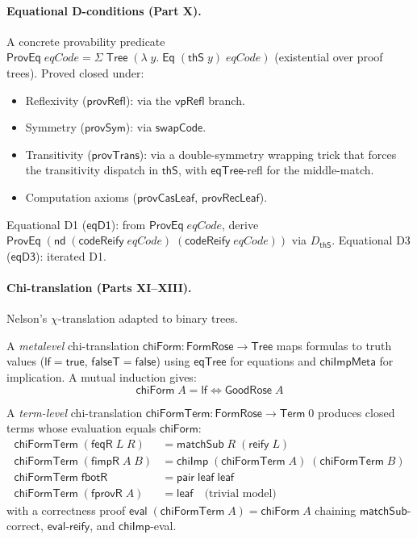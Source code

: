 \documentclass[11pt]{article}
\newcommand{\lf}{\mathsf{lf}}
\newcommand{\nd}{\mathsf{nd}}
\newcommand{\eval}{\mathsf{eval}}
\newcommand{\reify}{\mathsf{reify}}
\newcommand{\codeReify}{\mathsf{codeReify}}
\newcommand{\thS}{\mathsf{thS}}
\newcommand{\eqTree}{\mathsf{eqTree}}
\newcommand{\swapCode}{\mathsf{swapCode}}
\newcommand{\Tree}{\mathsf{Tree}}
\newcommand{\Term}{\mathsf{Term}}
\newcommand{\Eq}{\mathsf{Eq}}
\newcommand{\dThS}{D_{\thS}}
\begin{document}
\paragraph{Equational D-conditions (Part X).}
A concrete provability predicate $\mathsf{ProvEq}\;\mathit{eqCode} =
\Sigma\;\Tree\;(\lambda\;y.\;\Eq\;(\thS\;y)\;\mathit{eqCode})$ (existential
over proof trees). Proved closed under:
\begin{itemize}
  \item Reflexivity ($\mathsf{provRefl}$): via the $\mathsf{vpRefl}$ branch.
  \item Symmetry ($\mathsf{provSym}$): via $\swapCode$.
  \item Transitivity ($\mathsf{provTrans}$): via a double-symmetry wrapping trick
    that forces the transitivity dispatch in $\thS$, with $\eqTree$-refl for the
    middle-match.
  \item Computation axioms ($\mathsf{provCasLeaf}$, $\mathsf{provRecLeaf}$).
\end{itemize}
Equational D1 ($\mathsf{eqD1}$): from $\mathsf{ProvEq}\;\mathit{eqCode}$,
derive $\mathsf{ProvEq}\;(\nd\;(\codeReify\;\mathit{eqCode})\;(\codeReify\;\mathit{eqCode}))$
via $\dThS$. Equational D3 ($\mathsf{eqD3}$): iterated D1.

\paragraph{Chi-translation (Parts XI--XIII).}
Nelson's $\chi$-translation adapted to binary trees.

A \emph{metalevel} chi-translation $\mathsf{chiForm} : \mathsf{FormRose} \to \Tree$
maps formulas to truth values ($\lf = \mathsf{true}$, $\mathsf{falseT} = \mathsf{false}$)
using $\eqTree$ for equations and $\mathsf{chiImpMeta}$ for implication.
A mutual induction gives:
\[
  \mathsf{chiForm}\;A = \lf \iff \mathsf{GoodRose}\;A
\]

A \emph{term-level} chi-translation $\mathsf{chiFormTerm} : \mathsf{FormRose}
\to \Term\;0$ produces closed terms whose evaluation equals $\mathsf{chiForm}$:
\begin{align*}
  \mathsf{chiFormTerm}\;(\mathsf{feqR}\;L\;R) &= \mathsf{matchSub}\;R\;(\reify\;L) \\
  \mathsf{chiFormTerm}\;(\mathsf{fimpR}\;A\;B) &= \mathsf{chiImp}\;(\mathsf{chiFormTerm}\;A)\;(\mathsf{chiFormTerm}\;B) \\
  \mathsf{chiFormTerm}\;\mathsf{fbotR} &= \mathsf{pair}\;\mathsf{leaf}\;\mathsf{leaf} \\
  \mathsf{chiFormTerm}\;(\mathsf{fprovR}\;A) &= \mathsf{leaf} \quad\text{(trivial model)}
\end{align*}
with a correctness proof $\eval\;(\mathsf{chiFormTerm}\;A) = \mathsf{chiForm}\;A$
chaining $\mathsf{matchSub}$-correct, $\eval$-$\reify$, and $\mathsf{chiImp}$-eval.
\end{document}
